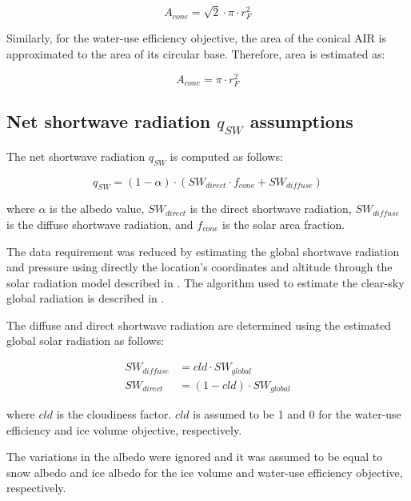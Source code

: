 \documentclass[tc, manuscript]{copernicus}
\begin{document}
\begin{equation} A_{cone} =\sqrt{2} \cdot \pi \cdot r_{F}^2  \end{equation}

Similarly, for the water-use efficiency objective, the area of the conical AIR is approximated to the area of
its circular base. Therefore, area is estimated as:

\begin{equation} A_{cone} =\pi \cdot r_{F}^2  \end{equation}

\subsection{Net shortwave radiation \texorpdfstring{$q_{SW}$}{Lg} assumptions}
\label{sec:SW}

The net shortwave radiation $q_{SW}$ is computed as follows:

\begin{equation} 
q_{SW} = (1- \alpha) \cdot ( SW_{direct} \cdot f_{cone} + SW_{diffuse})
\label{eqn:SW} 
\end{equation}

where $\alpha$ is the albedo value, $SW_{direct}$ is the direct shortwave radiation, $SW_{diffuse}$ is the
diffuse shortwave radiation, and $f_{cone}$ is the solar area fraction.

The data requirement was reduced by estimating the global shortwave radiation and pressure using directly the
location's coordinates and altitude through the solar radiation model described in
\citet{holmgrenPvlibPythonPython2018}. The algorithm used to estimate the clear-sky global radiation is
described in \citet{ineichenBroadbandSimplifiedVersion2008}.  

The diffuse and direct shortwave radiation are determined using the estimated global solar radiation as follows:

\begin{equation}
\begin{split}
  SW_{diffuse} &= cld \cdot SW_{global}\\
  SW_{direct} &= (1-cld) \cdot SW_{global}
\end{split}
\end{equation}

where $cld$ is the cloudiness factor. $cld$ is assumed to be 1 and 0 for the water-use efficiency and ice volume
objective, respectively.

The variations in the albedo were ignored and it was assumed to be equal to snow albedo and ice albedo for the
ice volume and water-use efficiency objective, respectively.
\end{document}
